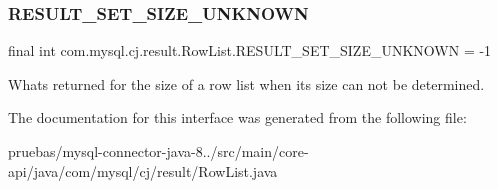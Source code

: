 \subsubsection{\texorpdfstring{R\+E\+S\+U\+L\+T\+\_\+\+S\+E\+T\+\_\+\+S\+I\+Z\+E\+\_\+\+U\+N\+K\+N\+O\+WN}{RESULT\_SET\_SIZE\_UNKNOWN}}
{\footnotesize\ttfamily final int com.\+mysql.\+cj.\+result.\+Row\+List.\+R\+E\+S\+U\+L\+T\+\_\+\+S\+E\+T\+\_\+\+S\+I\+Z\+E\+\_\+\+U\+N\+K\+N\+O\+WN = -\/1\hspace{0.3cm}{\ttfamily [static]}}

What\textquotesingle{}s returned for the size of a row list when its size can not be determined. 

The documentation for this interface was generated from the following file\+:\begin{DoxyCompactItemize}
\item 
pruebas/mysql-\/connector-\/java-\/8../src/main/core-\/api/java/com/mysql/cj/result/Row\+List.\+java\end{DoxyCompactItemize}
